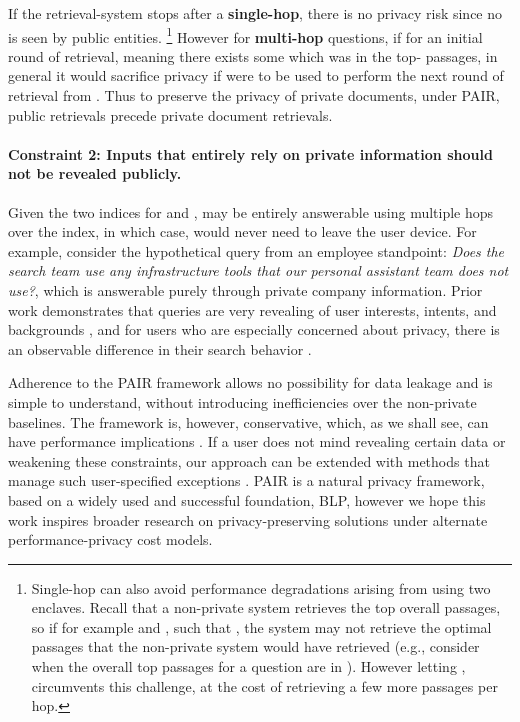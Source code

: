 \documentclass{article}
\renewcommand\cite{\citep}	\newcommand\shortcite{\citeyearpar}\newcommand\newcite{\citet}
\newcommand{\problemshortname}{\textsc{PAIR}\xspace}
\begin{document}
If the retrieval-system stops after a \textbf{single-hop}, there is no privacy risk since no  is seen by public entities. \footnote{Single-hop can also avoid performance degradations arising from using two enclaves. Recall that a non-private system retrieves the top  overall passages, so if for example  and , such that , the system may not retrieve the optimal  passages that the non-private system would have retrieved (e.g., consider when the overall top  passages for a question are in ). However letting ,   circumvents this challenge, at the cost of retrieving a few more passages per hop.}
However for \textbf{multi-hop} questions, if  for an initial round of retrieval, meaning there exists some  which was in the top- passages, in general it would sacrifice privacy if  were to be used to perform the next round of retrieval from . Thus to preserve the privacy of private documents, under \problemshortname, public retrievals precede private document retrievals. 


\paragraph{Constraint 2: Inputs that entirely rely on private information should not be revealed publicly.} Given the two indices for  and ,  may be entirely answerable using multiple hops over the  index, in which case,  would never need to leave the user device. For example, consider the hypothetical query from an employee standpoint: \textit{Does the search team use any infrastructure tools that our personal assistant team does not use?}, which is answerable purely through private company information.
Prior work demonstrates that queries are very revealing of user interests, intents, and backgrounds \cite{xu2007personalsearch, gervais2014queryobfusc, hill2012target}, and for users who are especially concerned about privacy, there is an observable difference in their search behavior \cite{zimmerman2019querybehavior}. 


Adherence to the \problemshortname framework allows no possibility for data leakage and is simple to understand, without introducing inefficiencies over the non-private baselines. The framework is, however, conservative, which, as we shall see, can have performance implications . 
If a user does not mind revealing certain data or weakening these constraints, our approach can be extended with methods that manage such user-specified exceptions \cite{xu2007personalsearch, shou2014personalsearch}. \problemshortname is a natural privacy framework, based on a widely used and successful foundation, BLP, however we hope this work inspires broader research on privacy-preserving solutions under alternate performance-privacy cost models. 
\end{document}
